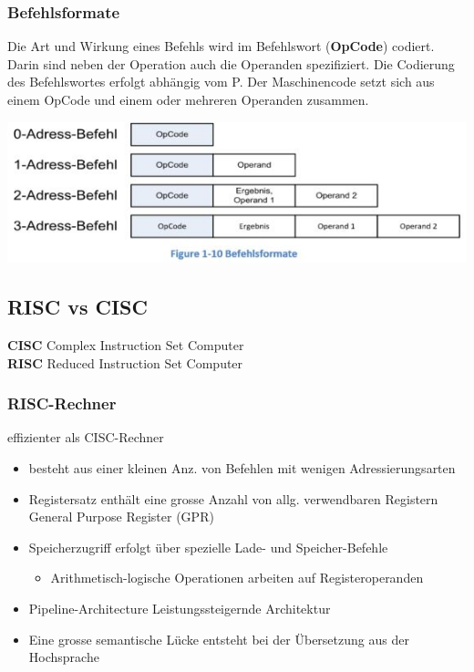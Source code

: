 \subsubsection{Befehlsformate}
\begin{multicols}{2}
\begin{minipage}{\linewidth}
Die Art und Wirkung eines Befehls wird im Befehlswort (\textbf{OpCode}) codiert.
Darin sind neben der Operation auch die Operanden spezifiziert.
Die Codierung des Befehlswortes erfolgt abhängig vom \mu P.
Der Maschinencode setzt sich aus einem OpCode und einem oder mehreren Operanden zusammen.
\end{minipage}

\includegraphics[width=\linewidth]{images/Befehlsformate}
\end{multicols}


\subsection{RISC vs CISC}
\begin{multicols}{2}
    \textbf{CISC}\newline
    Complex Instruction Set Computer
    \\
    \textbf{RISC}\newline
    Reduced Instruction Set Computer
\end{multicols}
\subsubsection{RISC-Rechner}
effizienter als CISC-Rechner
\begin{itemize}
    \item besteht aus einer kleinen Anz. von Befehlen mit wenigen Adressierungsarten
    \item Registersatz enthält eine grosse Anzahl von allg. verwendbaren Registern\newline
    General Purpose Register (GPR)
    \item Speicherzugriff erfolgt über spezielle Lade- und Speicher-Befehle
    \begin{itemize}
        \item Arithmetisch-logische Operationen arbeiten auf Registeroperanden
    \end{itemize}
    \item Pipeline-Architecture \leftarrow Leistungssteigernde Architektur
    \item Eine grosse semantische Lücke entsteht bei der Übersetzung aus der Hochsprache
\end{itemize}

